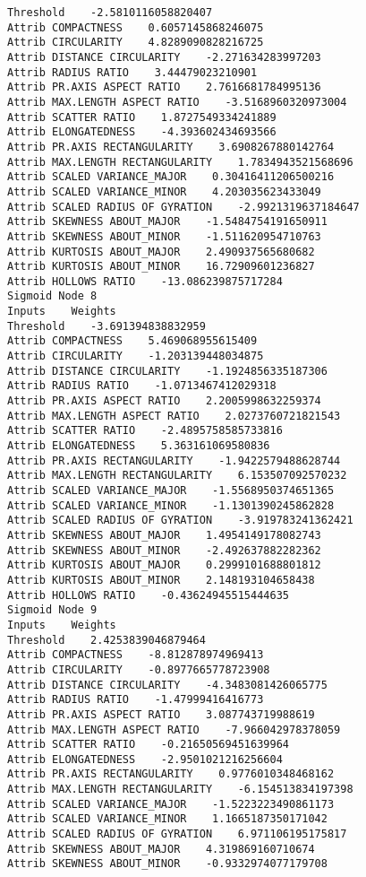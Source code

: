 \documentclass[
	article,			%
	11pt,				%
	oneside,			%
	a4paper,			%
	english,			%
	brazil,				%
	sumario=tradicional
	]{abntex2}
\begin{document}
\begin{lstlisting}
Threshold    -2.5810116058820407
Attrib COMPACTNESS    0.6057145868246075
Attrib CIRCULARITY    4.8289090828216725
Attrib DISTANCE CIRCULARITY    -2.271634283997203
Attrib RADIUS RATIO    3.44479023210901
Attrib PR.AXIS ASPECT RATIO    2.7616681784995136
Attrib MAX.LENGTH ASPECT RATIO    -3.5168960320973004
Attrib SCATTER RATIO    1.8727549334241889
Attrib ELONGATEDNESS    -4.393602434693566
Attrib PR.AXIS RECTANGULARITY    3.6908267880142764
Attrib MAX.LENGTH RECTANGULARITY    1.7834943521568696
Attrib SCALED VARIANCE_MAJOR    0.30416411206500216
Attrib SCALED VARIANCE_MINOR    4.203035623433049
Attrib SCALED RADIUS OF GYRATION    -2.9921319637184647
Attrib SKEWNESS ABOUT_MAJOR    -1.5484754191650911
Attrib SKEWNESS ABOUT_MINOR    -1.511620954710763
Attrib KURTOSIS ABOUT_MAJOR    2.490937565680682
Attrib KURTOSIS ABOUT_MINOR    16.72909601236827
Attrib HOLLOWS RATIO    -13.086239875717284
Sigmoid Node 8
Inputs    Weights
Threshold    -3.691394838832959
Attrib COMPACTNESS    5.469068955615409
Attrib CIRCULARITY    -1.203139448034875
Attrib DISTANCE CIRCULARITY    -1.1924856335187306
Attrib RADIUS RATIO    -1.0713467412029318
Attrib PR.AXIS ASPECT RATIO    2.2005998632259374
Attrib MAX.LENGTH ASPECT RATIO    2.0273760721821543
Attrib SCATTER RATIO    -2.4895758585733816
Attrib ELONGATEDNESS    5.363161069580836
Attrib PR.AXIS RECTANGULARITY    -1.9422579488628744
Attrib MAX.LENGTH RECTANGULARITY    6.153507092570232
Attrib SCALED VARIANCE_MAJOR    -1.5568950374651365
Attrib SCALED VARIANCE_MINOR    -1.1301390245862828
Attrib SCALED RADIUS OF GYRATION    -3.919783241362421
Attrib SKEWNESS ABOUT_MAJOR    1.4954149178082743
Attrib SKEWNESS ABOUT_MINOR    -2.492637882282362
Attrib KURTOSIS ABOUT_MAJOR    0.2999101688801812
Attrib KURTOSIS ABOUT_MINOR    2.148193104658438
Attrib HOLLOWS RATIO    -0.43624945515444635
Sigmoid Node 9
Inputs    Weights
Threshold    2.4253839046879464
Attrib COMPACTNESS    -8.812878974969413
Attrib CIRCULARITY    -0.8977665778723908
Attrib DISTANCE CIRCULARITY    -4.3483081426065775
Attrib RADIUS RATIO    -1.47999416416773
Attrib PR.AXIS ASPECT RATIO    3.087743719988619
Attrib MAX.LENGTH ASPECT RATIO    -7.966042978378059
Attrib SCATTER RATIO    -0.21650569451639964
Attrib ELONGATEDNESS    -2.9501021216256604
Attrib PR.AXIS RECTANGULARITY    0.9776010348468162
Attrib MAX.LENGTH RECTANGULARITY    -6.154513834197398
Attrib SCALED VARIANCE_MAJOR    -1.5223223490861173
Attrib SCALED VARIANCE_MINOR    1.1665187350171042
Attrib SCALED RADIUS OF GYRATION    6.971106195175817
Attrib SKEWNESS ABOUT_MAJOR    4.319869160710674
Attrib SKEWNESS ABOUT_MINOR    -0.9332974077179708

\end{lstlisting}
\end{document}
